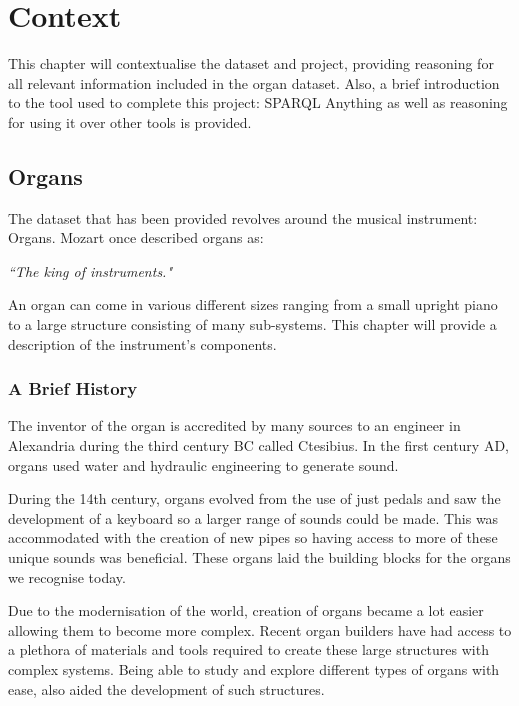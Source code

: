 \chapter{Context}
This chapter will contextualise the dataset and project, providing reasoning for all relevant information included in the organ dataset. Also, a brief introduction to the tool used to complete this project: SPARQL Anything as well as reasoning for using it over other tools is provided. 

\section{Organs}
\hspace{0.5cm} The dataset that has been provided revolves around the musical instrument: Organs. Mozart once described organs as:

\vspace{-0.15cm}
\begin{displayquote}
    \textit{``The king of instruments."}
\end{displayquote}
\vspace{-0.15cm}

An organ can come in various different sizes ranging from a small upright piano to a large structure consisting of many sub-systems. This chapter will provide a description of the instrument's components.

\subsection{A Brief History}
\hspace{0.5cm} 
The inventor of the organ is accredited by many sources to an engineer in Alexandria during the third century BC called Ctesibius. In the first century AD, organs used water and hydraulic engineering to generate sound. \cite{organhistory}

During the 14th century, organs evolved from the use of just pedals and saw the development of a keyboard so a larger range of sounds could be made. This was accommodated with the creation of new pipes so having access to more of these unique sounds was beneficial. These organs laid the building blocks for the organs we recognise today. \cite{organmedivalhistory}

Due to the modernisation of the world, creation of organs became a lot easier allowing them to become more complex. Recent organ builders have had access to a plethora of materials and tools required to create these large structures with complex systems. Being able to study and explore different types of organs with ease, also aided the development of such structures.  \cite{organhistory1}

